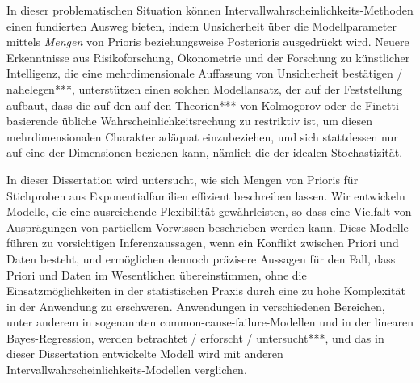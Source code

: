 In dieser problematischen Situation können Intervallwahrscheinlichkeits-Methoden einen
fundierten Ausweg bieten, indem Unsicherheit über die Modellparameter mittels
\emph{Mengen} von Prioris beziehungsweise Posterioris ausgedrückt wird.
Neuere Erkenntnisse aus Risikoforschung, Ökonometrie und der Forschung zu künstlicher Intelligenz,
die eine mehrdimensionale Auffassung von Unsicherheit bestätigen / nahelegen***,
unterstützen einen solchen Modellansatz,
der auf der Feststellung aufbaut, dass die auf den
auf den Theorien*** von Kolmogorov oder de Finetti basierende
übliche Wahrscheinlichkeitsrechung zu restriktiv ist,
um diesen mehrdimensionalen Charakter adäquat einzubeziehen,
und sich stattdessen nur auf eine der Dimensionen beziehen kann,
nämlich die der idealen Stochastizität.

In dieser Dissertation wird untersucht, wie sich Mengen von Prioris
für Stichproben aus Exponentialfamilien effizient beschreiben lassen.
Wir entwickeln Modelle, die eine ausreichende Flexibilität gewährleisten,
so dass eine Vielfalt von Ausprägungen von partiellem Vorwissen beschrieben werden kann.
Diese Modelle führen zu vorsichtigen Inferenzaussagen,
wenn ein Konflikt zwischen Priori und Daten besteht,
und ermöglichen dennoch präzisere Aussagen für den Fall, dass Priori und Daten im Wesentlichen übereinstimmen,
ohne die Einsatzmöglichkeiten in der statistischen Praxis durch
eine zu hohe Komplexität in der Anwendung zu erschweren.
Anwendungen in verschiedenen Bereichen, unter anderem in sogenannten
common-cause-failure-Modellen und in der linearen Bayes-Regression,
werden betrachtet / erforscht / untersucht***, 
und das in dieser Dissertation entwickelte Modell wird mit anderen Intervallwahrscheinlichkeits-Modellen verglichen.


